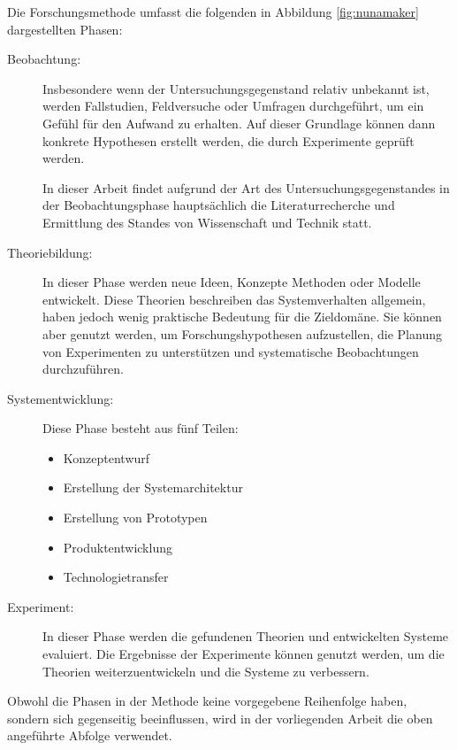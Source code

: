 Die Forschungsmethode umfasst die folgenden in Abbildung \ref{fig:nunamaker} dargestellten Phasen:
\begin{description}
\item[Beobachtung:] Insbesondere wenn der Untersuchungsgegenstand relativ unbekannt ist, werden Fallstudien, Feldversuche oder Umfragen durchgeführt, um ein \glqq Gefühl\grqq{} für den Aufwand zu erhalten. Auf dieser Grundlage können dann konkrete Hypothesen erstellt werden, die durch Experimente geprüft werden. 

In dieser Arbeit findet aufgrund der Art des Untersuchungsgegenstandes in der Beobachtungsphase hauptsächlich die Literaturrecherche und Ermittlung des Standes von Wissenschaft und Technik statt.

\item[Theoriebildung:] In dieser Phase werden neue Ideen, Konzepte Methoden oder Modelle entwickelt. Diese Theorien beschreiben das Systemverhalten allgemein, haben jedoch wenig praktische Bedeutung für die Zieldomäne. Sie können aber genutzt werden, um Forschungshypothesen aufzustellen, die Planung von Experimenten zu unterstützen und systematische Beobachtungen durchzuführen.

\item[Systementwicklung:] Diese Phase besteht aus fünf Teilen:
\begin{itemize}
\item Konzeptentwurf

\item Erstellung der Systemarchitektur

\item Erstellung von Prototypen

\item Produktentwicklung

\item Technologietransfer
\end{itemize}


\item[Experiment:] In dieser Phase werden die gefundenen Theorien und entwickelten Systeme evaluiert. Die Ergebnisse der Experimente können genutzt werden, um die Theorien weiterzuentwickeln und die Systeme zu verbessern.

\end{description}

Obwohl die Phasen in der Methode keine vorgegebene Reihenfolge haben, sondern sich gegenseitig beeinflussen, wird in der vorliegenden Arbeit die oben angeführte Abfolge verwendet.

